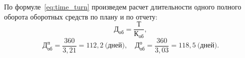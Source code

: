 По формуле~\ref{eq:time_turn} произведем расчет длительности одного полного оборота
оборотных средств по плану и по отчету:
\begin{equation}
\label{eq:time_turn}
\text{Д}_\text{об} = \dfrac{\text{Т}}{\text{К}_\text{об}},
\end{equation}
\vspace{-1.8cm}
\begin{equation*}
\text{Д}^\text{п}_\text{об} = \dfrac{360}{3{,}21} = 112{,}2 \: \text{(дней)}, \quad
\text{Д}^\text{о}_\text{об} = \dfrac{360}{3{,}03} = 118{,}5 \: \text{(дней)}. 
\end{equation*}

\newpage
